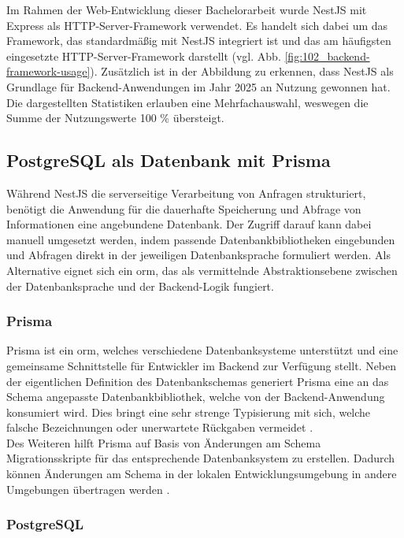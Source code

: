 Im Rahmen der Web-Entwicklung dieser Bachelorarbeit wurde NestJS mit Express als HTTP-Server-Framework verwendet. Es handelt sich dabei um das Framework, das standardmäßig mit NestJS integriert ist und das am häufigsten eingesetzte HTTP-Server-Framework darstellt (vgl. Abb. \ref{fig:102_backend-framework-usage}). 
Zusätzlich ist in der Abbildung zu erkennen, dass NestJS als Grundlage für Backend-Anwendungen im Jahr 2025 an Nutzung gewonnen hat.
Die dargestellten Statistiken erlauben eine Mehrfachauswahl, weswegen die Summe der Nutzungswerte 100 \% übersteigt.

\subsection{PostgreSQL als Datenbank mit Prisma}
\label{sec:postgresql-prisma}

Während NestJS die serverseitige Verarbeitung von Anfragen strukturiert, benötigt die Anwendung für die dauerhafte Speicherung und Abfrage von Informationen eine angebundene Datenbank.
Der Zugriff darauf kann dabei manuell umgesetzt werden, indem passende Datenbankbibliotheken eingebunden und Abfragen direkt in der jeweiligen Datenbanksprache formuliert werden.
Als Alternative eignet sich ein \gls{orm}, das als vermittelnde Abstraktionsebene zwischen der Datenbanksprache und der Backend-Logik fungiert.

\subsubsection{Prisma}

Prisma ist ein \gls{orm}, welches verschiedene Datenbanksysteme unterstützt und eine gemeinsame Schnittstelle für Entwickler im Backend zur Verfügung stellt.
Neben der eigentlichen Definition des Datenbankschemas generiert Prisma eine an das Schema angepasste Datenbankbibliothek, welche von der Backend-Anwendung konsumiert wird.
Dies bringt eine sehr strenge Typisierung mit sich, welche falsche Bezeichnungen oder unerwartete Rückgaben vermeidet \cite{prismaUnknownDocumentation}. \\

Des Weiteren hilft Prisma auf Basis von Änderungen am Schema Migrationsskripte für das entsprechende Datenbanksystem zu erstellen. 
Dadurch können Änderungen am Schema in der lokalen Entwicklungsumgebung in andere Umgebungen übertragen werden \cite{prismaUnknownDocumentation}.

\subsubsection{PostgreSQL}

